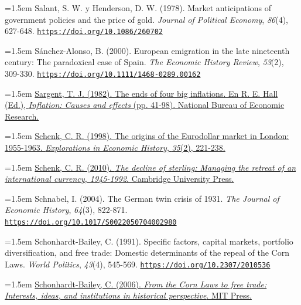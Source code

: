 \documentclass[10pt,a4paper]{article}
\begin{document}
{\sloppy\noindent\hangindent=1.5em Salant, S. W. y Henderson, D. W. (1978). Market anticipations of government policies and the price of gold. \textit{Journal of Political Economy}, \textit{86}(4), 627-648. \href{https://doi.org/10.1086/260702}{\nolinkurl{https://doi.org/10.1086/260702}}\par}

{\sloppy\noindent\hangindent=1.5em Sánchez-Alonso, B. (2000). European emigration in the late nineteenth century: The paradoxical case of Spain. \textit{The Economic History Review}, \textit{53}(2), 309-330. \href{https://doi.org/10.1111/1468-0289.00162}{\nolinkurl{https://doi.org/10.1111/1468-0289.00162}}\par}

{\sloppy\noindent\hangindent=1.5em \href{https://www.nber.org/chapters/c11452.pdf}{Sargent, T. J. (1982). The ends of four big inflations. En R. E. Hall (Ed.), \textit{Inflation: Causes and effects} (pp. 41-98). National Bureau of Economic Research.}\par}

{\sloppy\noindent\hangindent=1.5em \href{https://ideas.repec.org/a/eee/exehis/v35y1998i2p221-238.html}{Schenk, C. R. (1998). The origins of the Eurodollar market in London: 1955-1963. \textit{Explorations in Economic History}, \textit{35}(2), 221-238.}\par}

{\sloppy\noindent\hangindent=1.5em \href{https://eprints.gla.ac.uk/29894}{Schenk, C. R. (2010). \textit{The decline of sterling: Managing the retreat of an international currency, 1945-1992}. Cambridge University Press.}\par}

{\sloppy\noindent\hangindent=1.5em Schnabel, I. (2004). The German twin crisis of 1931. \textit{The Journal of Economic History}, \textit{64}(3), 822-871. \href{https://doi.org/10.1017/S0022050704002980}{\nolinkurl{https://doi.org/10.1017/S0022050704002980}}\par}

{\sloppy\noindent\hangindent=1.5em Schonhardt-Bailey, C. (1991). Specific factors, capital markets, portfolio diversification, and free trade: Domestic determinants of the repeal of the Corn Laws. \textit{World Politics}, \textit{43}(4), 545-569. \href{https://doi.org/10.2307/2010536}{\nolinkurl{https://doi.org/10.2307/2010536}}\par}

{\sloppy\noindent\hangindent=1.5em \href{https://econpapers.repec.org/RePEc:mtp:titles:0262195437}{Schonhardt-Bailey, C. (2006). \textit{From the Corn Laws to free trade: Interests, ideas, and institutions in historical perspective}. MIT Press.}\par}
\end{document}
